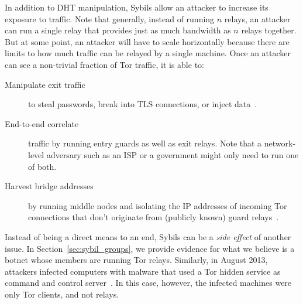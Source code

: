 In addition to DHT manipulation, Sybils allow an attacker to increase its
exposure to traffic.  Note that generally, instead of running $n$ relays, an
attacker can run a single relay that provides just as much bandwidth as $n$
relays together.  But at some point, an attacker will have to scale
horizontally because there are limits to how much traffic can be relayed by a
single machine.  Once an attacker can see a non-trivial fraction of Tor
traffic, it is able to:
\begin{description}
	\item[Manipulate exit traffic] to steal passwords, break into TLS
		connections, or inject data~\cite{Winter2014a}.
	\item[End-to-end correlate] traffic by running entry guards as well as exit
		relays.  Note that a network-level adversary such as an ISP or a
		government might only need to run one of both.
	\item[Harvest bridge addresses] by running middle nodes and isolating the
		IP addresses of incoming Tor connections that don't originate from
		(publicly known) guard relays~\cite{Ling2012a}.
\end{description}

Instead of being a direct means to an end, Sybils can be a \emph{side effect}
of another issue.  In Section~\ref{sec:sybil_groups}, we provide evidence for
what we believe is a botnet whose members are running Tor relays.  Similarly,
in August 2013, attackers infected computers with malware that used a Tor
hidden service as command and control server~\cite{Hopper2014a}.  In this case,
however, the infected machines were only Tor clients, and not relays.

